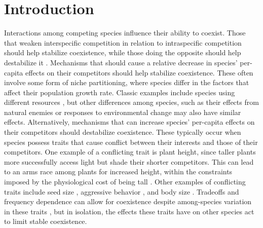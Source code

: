 
\section*{Introduction}

Interactions among competing species influence their ability to coexist.
Those that weaken interspecific competition in relation to
intraspecific competition should help stabilize coexistence,
while those doing the opposite should help destabilize it 
\citep{Chesson2000}.
Mechanisms that should cause a relative decrease in species'
per-capita effects on their competitors should help stabilize coexistence.
These often involve some form of niche partitioning, 
where species differ in the factors that affect their population growth rate.
Classic examples include species using different resources
\citep{Macarthur1967a,Roughgarden1976,Abrams2009},
but other differences among species, such as their 
effects from natural enemies
\citep{Grover1998,Vandermeer1998,Ehrlich2017a,Abrams2002}
or responses to environmental change
\citep{Chesson1997,Armstrong1976,Loreau1992,Chesson1994,Kremer2017,Pacala1994}
may also have similar effects.
Alternatively, mechanisms that can increase species' per-capita effects on 
their competitors should destabilize coexistence.
These typically occur when species possess traits that cause conflict
between their interests and those of their competitors.
One example of a conflicting trait is plant height, since taller plants 
more successfully access light but shade their shorter competitors.
This can lead to an arms race among plants for increased height, 
within the constraints imposed by the physiological cost of being tall
\citep{Falster2003}.
Other examples of conflicting traits include
seed size \citep{Geritz1999,Fagerstrdm2016},
aggressive behavior \citep{Brown1971},
and body size \citep{Kisdi2001}.
Tradeoffs and frequency dependence can allow for coexistence despite
among-species variation in these traits
\citep{Kisdi2001,Falster2003}, but in isolation, the effects these traits have
on other species act to limit stable coexistence.


